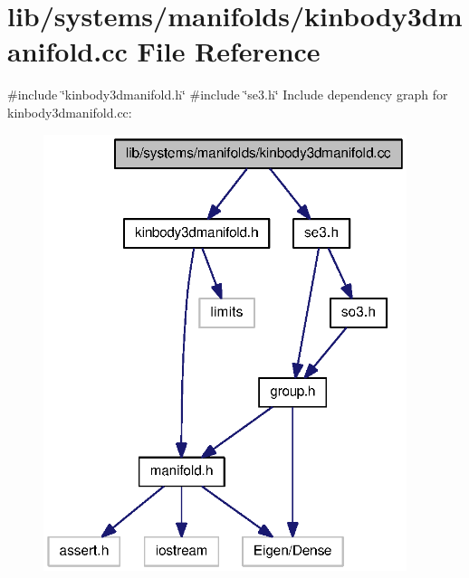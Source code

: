 \section{lib/systems/manifolds/kinbody3dmanifold.cc \-File \-Reference}
\label{kinbody3dmanifold_8cc}
{\ttfamily \#include \char`\"{}kinbody3dmanifold.\-h\char`\"{}}\*
{\ttfamily \#include \char`\"{}se3.\-h\char`\"{}}\*
\-Include dependency graph for kinbody3dmanifold.\-cc\-:\nopagebreak
\begin{figure}[H]
\begin{center}
\leavevmode
\includegraphics[width=301pt]{kinbody3dmanifold_8cc__incl}
\end{center}
\end{figure}
